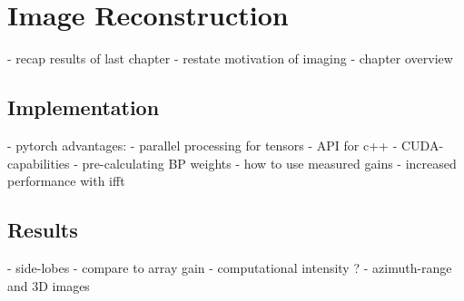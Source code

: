 \chapter{Image Reconstruction}
- recap results of last chapter
- restate motivation of imaging
- chapter overview

\section{Implementation}
- pytorch advantages:
- parallel processing for tensors
- API for c++
- CUDA-capabilities
- pre-calculating BP weights
- how to use measured gains
- increased performance with ifft

\section{Results}
- side-lobes
- compare to array gain
- computational intensity ?
- azimuth-range and 3D images
